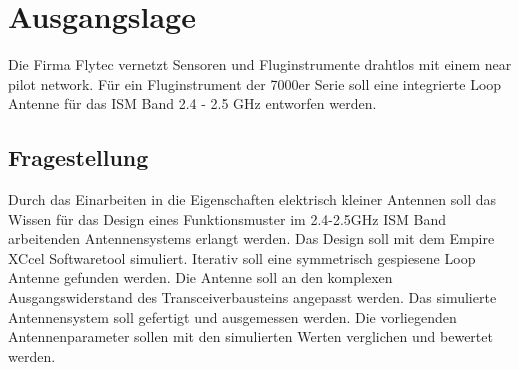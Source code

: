 \section{Ausgangslage}
Die Firma Flytec vernetzt Sensoren und Fluginstrumente drahtlos mit einem  near pilot network. Für ein Fluginstrument der 7000er Serie  soll eine integrierte Loop Antenne für das ISM Band 2.4 - 2.5 GHz entworfen werden.

\subsection{Fragestellung}
Durch das Einarbeiten in die Eigenschaften elektrisch kleiner Antennen soll das Wissen für das Design eines Funktionsmuster  im 2.4-2.5GHz ISM Band arbeitenden Antennensystems erlangt werden. Das Design soll mit dem Empire XCcel Softwaretool simuliert. Iterativ soll eine symmetrisch gespiesene Loop Antenne gefunden werden. Die Antenne soll an den komplexen Ausgangswiderstand des Transceiverbausteins angepasst werden. Das simulierte Antennensystem soll gefertigt und ausgemessen werden. Die vorliegenden Antennenparameter sollen mit den simulierten Werten verglichen und bewertet werden.  
